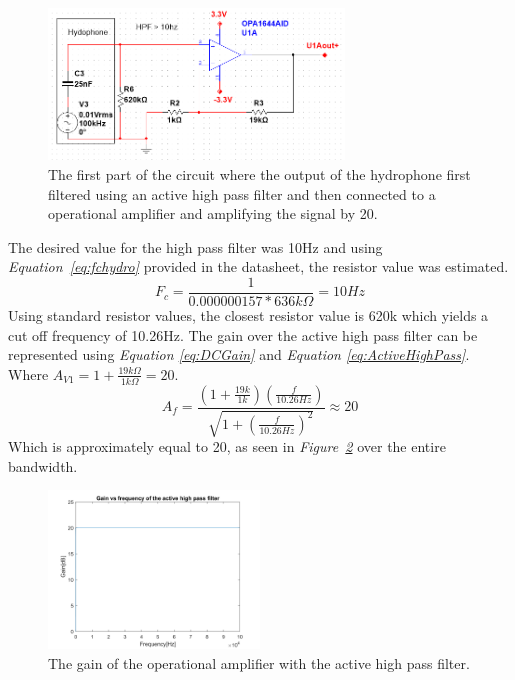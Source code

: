\begin{figure}[h]
    \centering
    \includegraphics[width=0.70\textwidth]{graphics/OPamp1.png}
    \caption{The first part of the circuit where the output of the hydrophone first filtered using an active high pass filter and then connected to a operational amplifier and amplifying the signal by 20.}
    \label{fig:Opamp1}
\end{figure}

\vspace{4cm}

The desired value for the high pass filter was 10Hz and using \textit{Equation~\ref{eq:fchydro}} provided in the datasheet, the resistor value was estimated.   
$$F_c = \frac{1}{0.000000157 * 636k\Omega} = 10Hz$$
Using standard resistor values, the closest resistor value is 620k which yields a cut off frequency of 10.26Hz.
The gain over the active high pass filter can be represented using \textit{Equation \ref{eq:DCGain}} and \textit{Equation \ref{eq:ActiveHighPass}}. 
Where $A_{V1} = 1 + \frac{19k\Omega}{1k\Omega} = 20$.
$$A_f = \frac{(1+\frac{19k}{1k})(\frac{f}{10.26Hz})}{\sqrt{1 + (\frac{f}{10.26Hz})^2}} \approx 20$$
Which is approximately equal to 20, as seen in \textit{Figure~\ref{fig:AVhighpass}} over the entire bandwidth.

\begin{figure}[h]
    \centering
    \includegraphics[width=0.5\textwidth]{graphics/Av_Highpass.png}
    \caption{The gain of the operational amplifier with the active high pass filter.}
    \label{fig:AVhighpass}
\end{figure}

